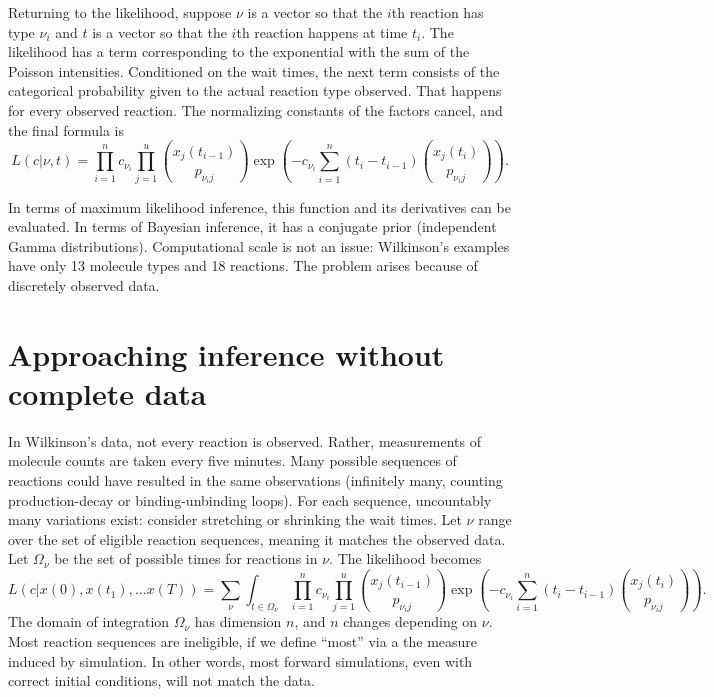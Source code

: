 \documentclass{article}
\begin{document}
Returning to the likelihood, suppose $\nu$ is a vector so that the $i$th reaction has type $\nu_i$ and $t$ is a vector so that the $i$th reaction happens at time $t_i$. The likelihood has a term corresponding to the exponential with the sum of the Poisson intensities. Conditioned on the wait times, the next term consists of the categorical probability given to the actual reaction type observed. That happens for every observed reaction. The normalizing constants of the factors cancel, and the final formula is $$L(c|\nu, t) = \prod_{i=1}^n c_{\nu_{i}} \prod_{j=1}^u {{x_{j}(t_{i-1})}\choose{p_{{\nu_{i}}j}}}\exp\left(-c_{\nu_{i}}\sum_{i=1}^{n} (t_{i}-t_{i-1}) {{x_j(t_{i})}\choose{p_{{\nu_{i}}j}}}\right).$$

In terms of maximum likelihood inference, this function and its derivatives can be evaluated. In terms of Bayesian inference, it has a conjugate prior (independent Gamma distributions). Computational scale is not an issue: Wilkinson's examples have only 13 molecule types and 18 reactions. The problem arises because of discretely observed data.

\section{Approaching inference without complete data}
\label{sec:intro_em}

In Wilkinson's data, not every reaction is observed. Rather, measurements of molecule counts are taken every five minutes. Many possible sequences of reactions could have resulted in the same observations (infinitely many, counting production-decay or binding-unbinding loops). For each sequence, uncountably many variations exist: consider stretching or shrinking the wait times. Let $\nu$ range over the set of eligible reaction sequences, meaning it matches the observed data. Let $\Omega_{\nu}$ be the set of possible times for reactions in $\nu$. The likelihood becomes 
\begin{equation}\label{eqn_nasty_lik}
L(c|x(0), x(t_1), ... x(T)) =\sum_{\nu}\int_{t\in \Omega_{\nu}} \prod_{i=1}^n c_{\nu_{i}} \prod_{j=1}^u {{x_{j}(t_{i-1})}\choose{p_{{\nu_{i}}j}}}\exp\left(-c_{\nu_{i}}\sum_{i=1}^{n} (t_{i}-t_{i-1}) {{x_j(t_{i})}\choose{p_{{\nu_{i}}j}}}\right).
\end{equation}
 The domain of integration $\Omega_{\nu}$ has dimension $n$, and $n$ changes depending on $\nu$. Most reaction sequences are ineligible, if we define ``most'' via a the measure induced by simulation. In other words, most forward simulations, even with correct initial conditions, will not match the data. 
\end{document}
